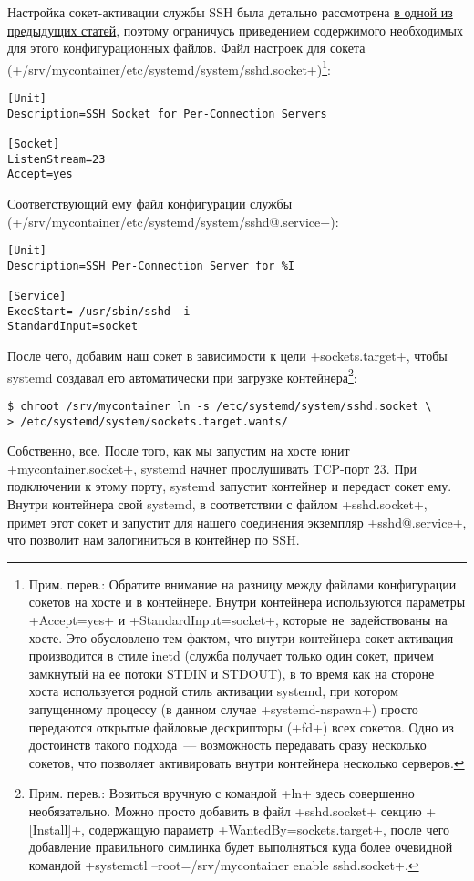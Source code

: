 \documentclass[10pt,oneside,a4paper]{article}
\begin{document}
Настройка сокет-активации службы SSH была детально рассмотрена 
\hyperref[sec:inetd]{в одной из предыдущих статей}, поэтому ограничусь
приведением содержимого необходимых для этого конфигурационных файлов. Файл
настроек для сокета
(+/srv/mycontainer/etc/systemd/system/sshd.socket+)\footnote{Прим. перев.:
Обратите внимание на разницу между файлами конфигурации сокетов на хосте и
в контейнере. Внутри контейнера используются параметры +Accept=yes+ и
+StandardInput=socket+, которые не~задействованы на хосте. Это обусловлено тем
фактом, что внутри контейнера сокет-активация производится в стиле inetd (служба
получает только один сокет, причем замкнутый на ее потоки STDIN и STDOUT), в то
время как на стороне хоста используется родной стиль активации systemd, при
котором запущенному процессу (в данном случае +systemd-nspawn+) просто
передаются открытые файловые дескрипторы (+fd+) всех сокетов. Одно из достоинств
такого подхода~--- возможность передавать сразу несколько сокетов, что позволяет
активировать внутри контейнера несколько серверов.}:
\begin{Verbatim}
[Unit]
Description=SSH Socket for Per-Connection Servers

[Socket]
ListenStream=23
Accept=yes
\end{Verbatim}

Соответствующий ему файл конфигурации службы \\
(+/srv/mycontainer/etc/systemd/system/sshd@.service+):
\begin{Verbatim}
[Unit]
Description=SSH Per-Connection Server for %I

[Service]
ExecStart=-/usr/sbin/sshd -i
StandardInput=socket
\end{Verbatim}

После чего, добавим наш сокет в зависимости к цели +sockets.target+, чтобы
systemd создавал его автоматически при загрузке контейнера\footnote{Прим.
перев.: Возиться вручную с командой +ln+ здесь совершенно необязательно. Можно
просто добавить в файл +sshd.socket+ секцию +[Install]+, содержащую параметр
+WantedBy=sockets.target+, после чего добавление правильного симлинка будет
выполняться куда более очевидной командой
+systemctl --root=/srv/mycontainer enable sshd.socket+.}:
\begin{Verbatim}
$ chroot /srv/mycontainer ln -s /etc/systemd/system/sshd.socket \
> /etc/systemd/system/sockets.target.wants/
\end{Verbatim}

Собственно, все. После того, как мы запустим на хосте юнит +mycontainer.socket+,
systemd начнет прослушивать TCP-порт 23. При подключении к этому порту, systemd
запустит контейнер и передаст сокет ему. Внутри контейнера свой systemd, в
соответствии с файлом +sshd.socket+, примет этот сокет и запустит для нашего
соединения экземпляр +sshd@.service+, что позволит нам залогиниться в контейнер
по SSH.
\end{document}
